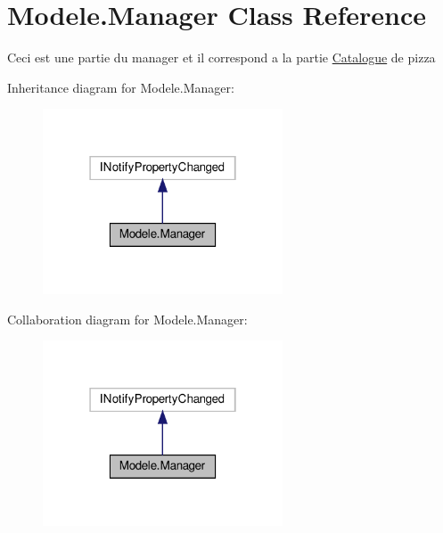 \hypertarget{classModele_1_1Manager}{}\section{Modele.\+Manager Class Reference}
\label{classModele_1_1Manager}


Ceci est une partie du manager et il correspond a la partie \hyperlink{classModele_1_1Catalogue}{Catalogue} de pizza  




Inheritance diagram for Modele.\+Manager\+:
\nopagebreak
\begin{figure}[H]
\begin{center}
\leavevmode
\includegraphics[width=202pt]{classModele_1_1Manager__inherit__graph}
\end{center}
\end{figure}


Collaboration diagram for Modele.\+Manager\+:
\nopagebreak
\begin{figure}[H]
\begin{center}
\leavevmode
\includegraphics[width=202pt]{classModele_1_1Manager__coll__graph}
\end{center}
\end{figure}
